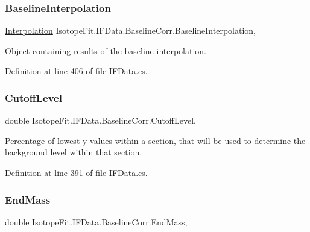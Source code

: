 \subsubsection{\texorpdfstring{Baseline\+Interpolation}{BaselineInterpolation}}
{\footnotesize\ttfamily \hyperlink{class_isotope_fit_1_1_interpolation}{Interpolation} Isotope\+Fit.\+I\+F\+Data.\+Baseline\+Corr.\+Baseline\+Interpolation\hspace{0.3cm}{\ttfamily [get]}, {\ttfamily [set]}}



Object containing results of the baseline interpolation. 



Definition at line 406 of file I\+F\+Data.\+cs.

\mbox{\label{class_isotope_fit_1_1_i_f_data_1_1_baseline_corr_a74196174b782a5c1b7a7f4377b0ff451}} 
\subsubsection{\texorpdfstring{Cutoff\+Level}{CutoffLevel}}
{\footnotesize\ttfamily double Isotope\+Fit.\+I\+F\+Data.\+Baseline\+Corr.\+Cutoff\+Level\hspace{0.3cm}{\ttfamily [get]}, {\ttfamily [set]}}



Percentage of lowest y-\/values within a section, that will be used to determine the background level within that section. 



Definition at line 391 of file I\+F\+Data.\+cs.

\mbox{\label{class_isotope_fit_1_1_i_f_data_1_1_baseline_corr_a3ddf6fd1df96bc69336b4b6822ad7e4f}} 
\subsubsection{\texorpdfstring{End\+Mass}{EndMass}}
{\footnotesize\ttfamily double Isotope\+Fit.\+I\+F\+Data.\+Baseline\+Corr.\+End\+Mass\hspace{0.3cm}{\ttfamily [get]}, {\ttfamily [set]}}



